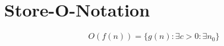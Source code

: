 \chapter{Store-O-Notation}
\label{ch:Store-O-Notation}

$$O(f(n)) = \{g(n):\exists c > 0: \exists n_0\}$$

